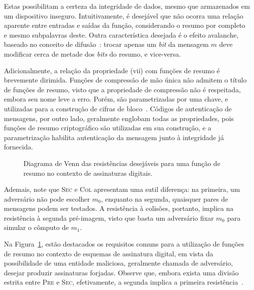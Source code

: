 \documentclass{ufsctex/ufsctex}
\begin{document}
Estas possibilitam a certeza da integridade de dados, mesmo que armazenados em
um dispositivo inseguro. Intuitivamente, é desejável que não ocorra uma relação
aparente entre entradas e saídas da função, considerando o resumo por completo
e mesmo subpalavras deste. Outra característica desejada é o efeito avalanche,
baseado no conceito de difusão~\cite[pp. 72]{Stallings:book:2010}: trocar
apenas um \emph{bit} da mensagem $m$ deve modificar cerca de metade dos
\emph{bits} do resumo, e vice-versa.

Adicionalmente, a relação da propriedade (vii) com funções de resumo é
brevemente dirimida. Funções de compressão de mão única não admitem o título de
funções de resumo, visto que a propriedade de compressão não é respeitada,
embora seu nome leve a erro. Porém, são parametrizadas por uma chave, e
utilizadas para a construção de cifras de bloco~\cite[Algoritmo
9.25]{Menezes:book:1996}. Códigos de autenticação de mensagens, por outro lado,
geralmente englobam todas as propriedades, pois funções de resumo criptográfico
são utilizadas em sua construção, e a parametrização habilita autenticação da
mensagem junto à integridade já fornecida.

\begin{figure}
  \centering
  \caption{Diagrama de Venn das resistências desejáveis para uma função de
    resumo no contexto de assinaturas digitais.}\label{fig:1}
\end{figure}

Ademais, note que \textsc{Sec} e \textsc{Col} apresentam uma sutil diferença:
na primeira, um adversário não pode escolher $m_{0}$, enquanto na segunda,
quaisquer pares de mensagens podem ser testados. A resistência à colisões,
portanto, implica na resistência à segunda pré-imagem, visto que basta um
adversário fixar $m_{0}$ para simular o cômputo de $m_{1}$.

Na Figura~\ref{fig:1}, estão destacados os requisitos comuns para a utilização
de funções de resumo no contexto de esquemas de assinatura digital, em vista da
possibilidade de uma entidade maliciosa, geralmente chamada de adversário,
desejar produzir assinaturas forjadas. Observe que, embora exista uma divisão
estrita entre \textsc{Pre} e \textsc{Sec}, efetivamente, a segunda implica a
primeira resistência~\cite[Nota 9.20]{Menezes:book:1996}.
\end{document}
